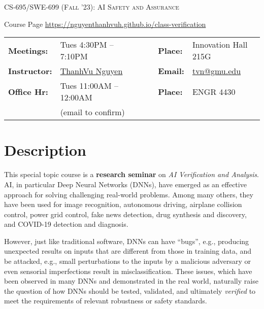 \documentclass[11pt]{article}
\begin{document}
\begin{center}
{\Large \textsc{CS-695/SWE-699 (Fall '23): AI Safety and Assurance}}
\end{center}
\begin{center}
Course Page \url{https://nguyenthanhvuh.github.io/class-verification}
\end{center}

\begin{center}
\begin{minipage}[t]{.75\textwidth}
\begin{tabular}{llcccll}
  \toprule
  \textbf{Meetings:} & Tues 4:30PM -- 7:10PM  & & & & \textbf{Place:} & Innovation Hall 215G\\
\textbf{Instructor:} & \href{https://go.gmu.edu/tvn}{ThanhVu Nguyen} & & &  & \textbf{Email:} &  \href{mailto:tvn@gmu.edu}{tvn@gmu.edu}\\
\textbf{Office Hr:} & Tues 11:00AM -- 12:00AM & & & & \textbf{Place:} & ENGR 4430\\
&(email to confirm)&&&&&\\
\bottomrule
\end{tabular}
\end{minipage}
\end{center}


\section{Description}
This special topic course is a \textbf{research seminar} on \emph{AI Verification and Analysis}.  AI, in particular Deep Neural Networks (DNNs), have emerged as an effective approach for solving challenging real-world problems. Among many others, they have been used for image recognition, autonomous driving, airplane collision control,
power grid control, fake news detection, drug synthesis and discovery, 
and COVID-19 detection and diagnosis.

However, just like traditional software, DNNs can have ``bugs'', e.g., producing unexpected results on inputs that are different from those in training data, and be attacked, e.g., small perturbations to the inputs by a malicious adversary or even sensorial imperfections result in misclassification.
These issues, which have been observed in many DNNs and demonstrated in the real world,  naturally raise the question of how DNNs should be tested, validated, and ultimately \emph{verified} to meet the requirements of relevant robustness or safety standards.
\end{document}
